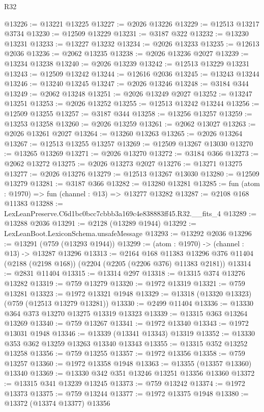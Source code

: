 \begin{lexlean}{R32}
\begin{coremodule}
@13226 := @13221 @13225
@13227 := @2026 @13226
@13229 := @12513 @13217 @3734
@13230 := @12509 @13229
@13231 := @3187 @322
@13232 := @13230 @13231
@13233 := @13227 @13232
@13234 := @2026 @13233
@13235 := @12613 @2036
@13236 := @2062 @13235
@13238 := @2026 @13236 @2027
@13239 := @13234 @13238
@13240 := @2026 @13239
@13242 := @12513 @13229 @13231
@13243 := @12509 @13242
@13244 := @12616 @2036
@13245 := @13243 @13244
@13246 := @13240 @13245
@13247 := @2026 @13246
@13248 := @3184 @344
@13249 := @2062 @13248
@13251 := @2026 @13249 @2027
@13252 := @13247 @13251
@13253 := @2026 @13252
@13255 := @12513 @13242 @13244
@13256 := @12509 @13255
@13257 := @3187 @344
@13258 := @13256 @13257
@13259 := @13253 @13258
@13260 := @2026 @13259
@13261 := @2062 @13027
@13263 := @2026 @13261 @2027
@13264 := @13260 @13263
@13265 := @2026 @13264
@13267 := @12513 @13255 @13257
@13269 := @12509 @13267 @13030
@13270 := @13265 @13269
@13271 := @2026 @13270
@13272 := @3184 @366
@13273 := @2062 @13272
@13275 := @2026 @13273 @2027
@13276 := @13271 @13275
@13277 := @2026 @13276
@13279 := @12513 @13267 @13030
@13280 := @12509 @13279
@13281 := @3187 @366
@13282 := @13280 @13281
@13285 := fun (atom : @1970) => fun (channel : @13) => @13277 @13282
@13287 := @2108 @168 @11383
@13288 := LexLeanPreserve.C6d1bc0bcc7cbbb3a169c4e838883ff45.R32.__fits_4
@13289 := @13288 @2036
@13291 := @2128 (@13289 @1944)
@13292 := LexLeanBoot.LexiconSchema.unsafeMessage
@13293 := @13292 @2036
@13296 := @13291 (@759 (@13293 @1944))
@13299 := (atom : @1970) -> (channel : @13) -> @13287 @13296
@13313 := @2164
    @168
    @11383
    @13296
    @376
    @11404
    (@2188 (@2198 @168))
    (@2204 (@2205 (@2206 @376) @11383 @2181))
@13314 := @2831 @11404
@13315 := @13314 @297
@13318 := @13315 @374 @13276 @13282
@13319 := @759 @13279
@13320 := @1972 @13319
@13321 := @759 @13281
@13323 := @1972 @13321 @1948
@13329 := @13318 (@13320 @13323) (@759 (@12513 @13279 @13281))
@13330 := @2499 @11404
@13336 := @13330 @364 @373 @13270 @13275 @13319 @13323
@13339 := @13315 @363 @13264 @13269
@13340 := @759 @13267
@13341 := @1972 @13340
@13343 := @1972 @13031 @1948
@13346 := @13339 (@13341 @13343) @13319
@13352 := @13330 @353 @362 @13259 @13263 @13340 @13343
@13355 := @13315 @352 @13252 @13258
@13356 := @759 @13255
@13357 := @1972 @13356
@13358 := @759 @13257
@13360 := @1972 @13358 @1948
@13363 := @13355 (@13357 @13360) @13340
@13369 := @13330 @342 @351 @13246 @13251 @13356 @13360
@13372 := @13315 @341 @13239 @13245
@13373 := @759 @13242
@13374 := @1972 @13373
@13375 := @759 @13244
@13377 := @1972 @13375 @1948
@13380 := @13372 (@13374 @13377) @13356

\end{coremodule}
\end{lexlean}
